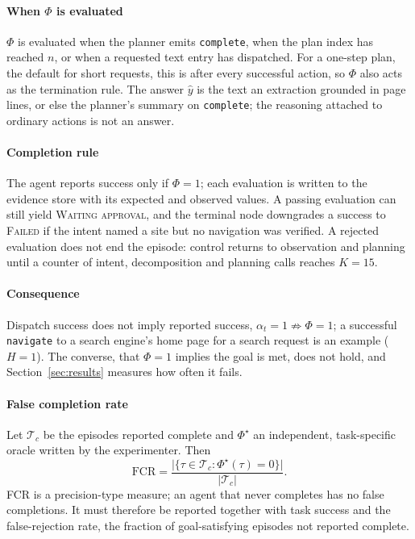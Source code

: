 \paragraph{When $\Phi$ is evaluated} $\Phi$ is evaluated when the planner emits \texttt{complete}, when the plan index has reached $n$, or when a requested text entry has dispatched. For a one-step plan, the default for short requests, this is after every successful action, so $\Phi$ also acts as the termination rule. The answer $\hat{y}$ is the text an extraction grounded in page lines, or else the planner's summary on \texttt{complete}; the reasoning attached to ordinary actions is not an answer.

\paragraph{Completion rule} The agent reports success only if $\Phi=1$; each evaluation is written to the evidence store with its expected and observed values. A passing evaluation can still yield \textsc{Waiting approval}, and the terminal node downgrades a success to \textsc{Failed} if the intent named a site but no navigation was verified. A rejected evaluation does not end the episode: control returns to observation and planning until a counter of intent, decomposition and planning calls reaches $K=15$.

\paragraph{Consequence} Dispatch success does not imply reported success, $\alpha_t = 1 \not\Rightarrow \Phi=1$; a successful \texttt{navigate} to a search engine's home page for a search request is an example ($H=1$). The converse, that $\Phi=1$ implies the goal is met, does not hold, and Section~\ref{sec:results} measures how often it fails.

\paragraph{False completion rate} Let $\mathcal{T}_c$ be the episodes reported complete and $\Phi^{\star}$ an independent, task-specific oracle written by the experimenter. Then
\begin{equation}
\mathrm{FCR} = \frac{\lvert\{\tau\in\mathcal{T}_c : \Phi^{\star}(\tau)=0\}\rvert}{\lvert\mathcal{T}_c\rvert}.
\label{eq:fcr}
\end{equation}
FCR is a precision-type measure; an agent that never completes has no false completions. It must therefore be reported together with task success and the false-rejection rate, the fraction of goal-satisfying episodes not reported complete.
